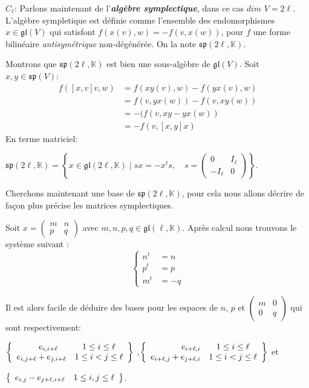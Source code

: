 \documentclass[a4paper,openany,12pt]{report}
\newcommand{\KK}{\mathbb{K}}
\newcommand{\gl}{\mathfrak{gl}}
\newcommand{\ssp}{\mathfrak{sp}}
\theoremstyle{break}
{\theorembodyfont{\upshape}
\newtheorem*{rmq}{Remarque :}
\newtheorem*{prv}{Preuve :}
\newtheorem*{ex}{Exemples :}
\newtheorem*{exe}{Exemple : }
\newtheorem*{nota}{Notation :}
\newtheorem*{dem}{D\'emonstration :}}
\begin{document}
$ C_{\ell} $: Parlons maintenant de l'\emph{\textbf{algèbre symplectique}}, dans ce cas $dim$ $V=2 \ell$. L'algèbre sympletique est définie comme l'ensemble des endomorphismes $x \in \gl(V)$ qui satisfont $f(x(v),w)=-f(v,x(w))$, pour $f$ une forme bilinéaire \textit{antisymétrique} non-dégénérée. On la note $\ssp (2\ell,\KK)$.

Montrons que $\ssp(2 \ell,\KK)$ est bien une sous-algèbre de $\gl(V)$. 
Soit $ x,y \in \ssp (V) $:
\begin{align*}
f([x,v]v ,w) &= f(xy(v),w)-f(yx(v),w) \\
           &= f(v,yx(w))-f(v,xy(w)) \\
           &= -(f(v,xy-yx(w) )\\
           &=-f(v,[x,y]x)
\end{align*} 
En terme matriciel:
\begin{center}
$\ssp (2 \ell,\KK)= \left \{ x\in \gl(2\ell,\KK) \mid sx=-x^ts, \quad s=\begin{pmatrix} 0 & I_\ell \\ -I_\ell & 0 \end{pmatrix} \right \}$.
\end{center}

Cherchons maintenant une base de $\ssp(2 \ell,\KK)$, pour cela nous allons décrire de façon plus précise les matrices symplectiques.

Soit $ x=\begin{pmatrix} m & n \\ p & q \end{pmatrix}$ avec $m,n,p,q \in \gl(\ell, \KK)$. Après calcul nous trouvons le système suivant : 
\[ \left\{
\begin{aligned}
n^t & = n \\
p^t & =p \\
 m^t & = -q
\end{aligned}
\right. \]

Il est alors facile de déduire des bases pour les espaces de $n$, $p$ et $\begin{pmatrix} m & 0 \\ 0 & q \end{pmatrix}$ qui sont respectivement: 
\begin{center}
$\left \{
   \begin{array}{r c l}
e_{i,i+\ell}\quad & 1\leq i \leq \ell \\
e_{i,j+\ell}+e_{j,i+\ell} & 1\leq i < j \leq \ell
   \end{array}
   \right  \}$
,$\left \{
   \begin{array}{r c l}
e_{i+\ell,i} &1\leq i \leq \ell \\
e_{i+\ell,j}+e_{j+\ell,i} & 1\leq i < j \leq \ell
   \end{array}
  \right   \} $
et 
\end{center}
\begin{center}
$\left \{
   \begin{array}{r c l}
e_{i,j}-e_{j+\ell,i+\ell} &1\leq i ,j \leq \ell
   \end{array}
\right   \}$.
\end{center}
\end{document}
